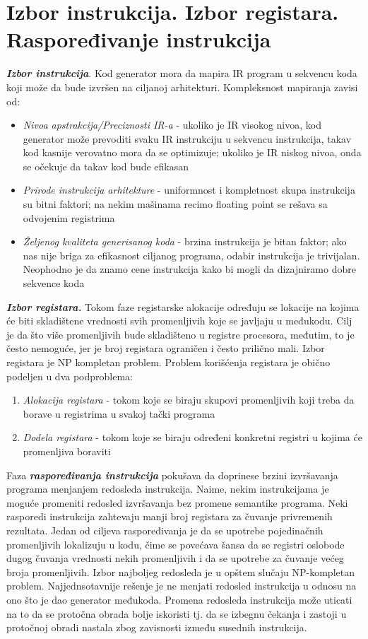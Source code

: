 \documentclass[10pt]{extarticle}
\begin{document}
\section{Izbor instrukcija. Izbor registara. Raspoređivanje instrukcija}
\noindent
\textit{\textbf{Izbor instrukcija}}. Kod generator mora da mapira IR program u sekvencu koda koji može da bude izvršen na ciljanoj arhitekturi. Kompleksnost mapiranja zavisi od:
\begin{itemize}
    \item \textit{Nivoa apstrakcija/Preciznosti IR-a} - ukoliko je IR visokog nivoa, kod generator može prevoditi svaku IR instrukciju u  sekvencu instrukcija, takav kod kasnije verovatno mora da se optimizuje; ukoliko je IR niskog nivoa, onda se očekuje da takav kod bude efikasan
    \item \textit{Prirode instrukcija arhitekture} - uniformnost i kompletnost skupa instrukcija su bitni faktori; na nekim mašinama recimo floating point se rešava sa odvojenim registrima 
    \item \textit{Željenog kvaliteta generisanog koda} - brzina instrukcija je bitan faktor; ako nas nije briga za efikasnost ciljanog programa, odabir instrukcija je trivijalan. Neophodno je da znamo cene instrukcija kako bi mogli da dizajniramo dobre sekvence koda
\end{itemize}
\textit{\textbf{Izbor registara.}} Tokom faze registarske alokacije određuju se lokacije na kojima će biti skladištene vrednosti svih promenljivih koje se javljaju u međukodu. Cilj je da što više promenljivih bude skladišteno u registre procesora, međutim, to je često nemoguće, jer je broj registara ograničen i često prilično mali. Izbor registara je NP kompletan problem. Problem korišćenja registara je obično podeljen u dva podproblema:
\begin{enumerate}
    \item \textit{Alokacija registara} - tokom koje se biraju skupovi promenljivih koji treba da borave u registrima u svakoj tački programa
    \item \textit{Dodela registara} - tokom koje se biraju određeni konkretni registri u kojima će promenljiva boraviti
\end{enumerate}
Faza \textit{\textbf{raspoređivanja instrukcija}} pokušava da doprinese brzini izvršavanja programa menjanjem redosleda instrukcija. Naime, nekim instrukcijama je moguće promeniti redosled izvršavanja bez promene semantike programa. Neki rasporedi instrukcija zahtevaju manji broj registara za čuvanje privremenih rezultata. Jedan od ciljeva raspoređivanja je da se upotrebe pojedinačnih promenljivih lokalizuju u kodu, čime se povećava šansa da se registri oslobode dugog čuvanja vrednosti nekih promenljivih i da se upotrebe za čuvanje većeg broja promenljivih. 
Izbor najboljeg redosleda je u opštem slučaju NP-kompletan problem. Najjednsotavnije rešenje je ne menjati redosled instrukcija u odnosu na ono što je dao generator međukoda. Promena redosleda instrukcija može uticati na to da se protočna obrada bolje iskoristi tj. da se izbegnu čekanja i zastoji u protočnoj obradi nastala zbog zavisnosti između susednih instrukcija.
\end{document}
